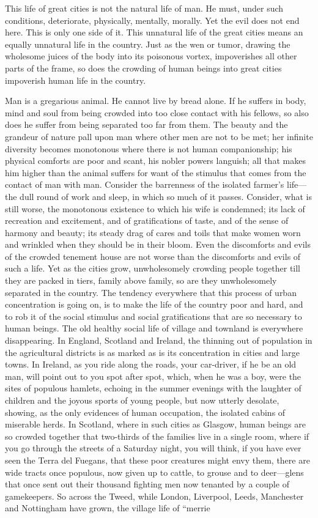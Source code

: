 \documentclass{book}
\begin{document}
This life of great cities is not the natural life of man. He must, under such conditions, deteriorate, physically, mentally, morally. Yet the evil does not end here. This is only one side of it. This unnatural life of the great cities means an equally unnatural life in the country. Just as the wen or tumor, drawing the wholesome juices of the body into its poisonous vortex, impoverishes all other parts of the frame, so does the crowding of human beings into great cities impoverish human life in the country.

Man is a gregarious animal. He cannot live by bread alone. If he suffers in body, mind and soul from being crowded into too close contact with his fellows, so also does he suffer from being separated too far from them. The beauty and the grandeur of nature pall upon man where other men are not to be met; her infinite diversity becomes monotonous where there is not human companionship; his physical comforts are poor and scant, his nobler powers languish; all that makes him higher than the animal suffers for want of the stimulus that comes from the contact of man with man. Consider the barrenness of the isolated farmer’s life—the dull round of work and sleep, in which so much of it passes. Consider, what is still worse, the monotonous existence to which his wife is condemned; its lack of recreation and excitement, and of gratifications of taste, and of the sense of harmony and beauty; its steady drag of cares and toils that make women worn and wrinkled when they should be in their bloom. Even the discomforts and evils of the crowded tenement house are not worse than the discomforts and evils of such a life. Yet as the cities grow, unwholesomely crowding people together till they are packed in tiers, family above family, so are they unwholesomely separated in the country. The tendency everywhere that this process of urban concentration is going on, is to make the life of the country poor and hard, and to rob it of the social stimulus and social gratifications that are so necessary to human beings. The old healthy social life of village and townland is everywhere disappearing. In England, Scotland and Ireland, the thinning out of population in the agricultural districts is as marked as is its concentration in cities and large towns. In Ireland, as you ride along the roads, your car-driver, if he be an old man, will point out to you spot after spot, which, when he was a boy, were the sites of populous hamlets, echoing in the summer evenings with the laughter of children and the joyous sports of young people, but now utterly desolate, showing, as the only evidences of human occupation, the isolated cabins of miserable herds. In Scotland, where in such cities as Glasgow, human beings are so crowded together that two-thirds of the families live in a single room, where if you go through the streets of a Saturday night, you will think, if you have ever seen the Terra del Fuegans, that these poor creatures might envy them, there are wide tracts once populous, now given up to cattle, to grouse and to deer—glens that once sent out their thousand fighting men now tenanted by a couple of gamekeepers. So across the Tweed, while London, Liverpool, Leeds, Manchester and Nottingham have grown, the village life of “merrie 
\end{document}
